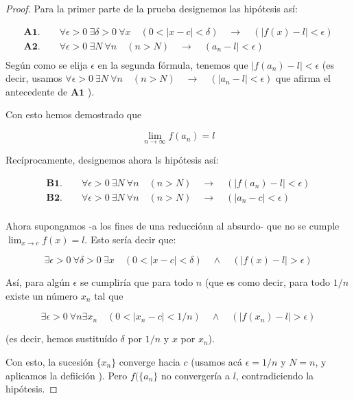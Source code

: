 \documentclass[14pt,a4paper]{extarticle}
\begin{document}
\begin{proof}
Para la primer parte de la prueba designemos las hip\'otesis as\'i:

\begin{align*}
&\textbf{A1.} \qquad  \forall \epsilon > 0 \ \exists \delta > 0 \ \forall x \quad
(0<|x-c|< \delta) \quad \to \quad (|f(x) - l| < \epsilon) & \\
&\textbf{A2.} \qquad \forall \epsilon > 0 \ \exists N \ \forall n \quad  (n > N) \quad \to \quad (a_n - l| < \epsilon) & \\
\end{align*}
Seg\'un como se elija \( \epsilon \) en la segunda f\'ormula, tenemos
que \( | f(a_n) - l | < \epsilon \) (es decir, usamos \( \forall \epsilon > 0 \ \exists N \ \forall n
\quad  (n > N) \quad \to \quad (|a_n - l| < \epsilon) \)
que afirma el antecedente de \( \textbf{A1} \) ).

Con esto hemos demostrado que

\[ \lim_{n \to \infty} f( a_n )= l \]

Rec\'iprocamente, designemos ahora ls hip\'otesis as\'i:

\begin{align*}
& \textbf{B1.} \qquad
 \forall \epsilon > 0 \ \exists N \ \forall n \quad  (n > N) \quad
\to \quad ( |f(a_n) - l| < \epsilon) & \\
& \textbf{B2.} \qquad
 \forall \epsilon > 0 \ \exists N \ \forall n \quad  (n > N) \quad
\to \quad ( |a_n - c| < \epsilon) & \\
\end{align*}

Ahora supongamos -a los fines de una reducci\'onn al absurdo- que no
se cumple \( \lim_{x \to c} f( x )= l \). Esto ser\'ia decir que:

\[ \exists \epsilon > 0 \ \forall \delta > 0 \ \exists x \quad
(0<|x-c|< \delta) \quad \wedge \quad (|f(x) - l| > \epsilon) \]

As\'i, para alg\'un \( \epsilon \) se cumplir\'ia que para todo \( n
\) (que es como decir, para todo \( 1/n \) existe un n\'umero \( x_n
\) tal que

\[ \exists \epsilon > 0 \ \forall n \exists x_n \quad
(0<|x_n-c|< 1/n) \quad \wedge \quad (|f(x_n) - l| > \epsilon) \]

(es decir, hemos sustitu\'ido \( \delta \) por \( 1/n \) y \( x \) por
\( x_n \)).

Con esto, la sucesi\'on \( \{ x_n \} \) converge hacia \( c \) (usamos
ac\'a \( \epsilon = 1/n \) y \( N = n \), y aplicamos la defiici\'on
). Pero \( f( \{ a_n \} \) no converger\'ia a \( l \),
contradiciendo la hip\'otesis.
\end{proof}
\end{document}
